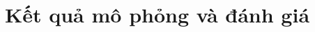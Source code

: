 \clearpage
{}

\setcounter{chapter}{2}
\chapter[{KẾT QUẢ MÔ PHỎNG VÀ ĐÁNH GIÁ}]{Kết quả mô phỏng và đánh giá   }
\label{sec:results}